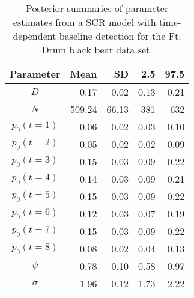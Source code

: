 \begin{table}[ht]
\centering
\caption{Posterior summaries of parameter estimates from a SCR model with time-dependent baseline 
detection for the Ft. Drum black bear data set.}
\begin{tabular}{crrrr}
\hline
Parameter & Mean & SD & 2.5 & 97.5 \\
\hline
$D$           &    0.17     &  0.02    & 0.13 & 0.21 \\
$N$           &   509.24 &  66.13  & 381  & 632  \\
$p_0 (t=1)$  &    0.06     & 0.02     & 0.03  & 0.10  \\
$p_0 (t=2)$  &    0.05  & 0.02  &      0.02 & 0.09  \\
$p_0 (t=3)$  &    0.15 &  0.03  &     0.09 & 0.22  \\
$p_0 (t=4)$  &    0.14 &  0.03  &     0.09 & 0.21  \\
$p_0 (t=5)$  &    0.15 &  0.03  &    0.09 &  0.22  \\
$p_0 (t=6)$  &    0.12 &  0.03  &    0.07 & 0.19  \\
$p_0 (t=7)$  &    0.15 &  0.03  &    0.09 & 0.22  \\
$p_0 (t=8)$  &    0.08 &  0.02  &    0.04 & 0.13  \\
$\psi$  &   0.78 &  0.10  &  0.58 & 0.97  \\
$\sigma$ & 1.96 &  0.12  &   1.73 & 2.22  \\
\end{tabular}
\label{covariates.tab.SCRt}
\end{table}

